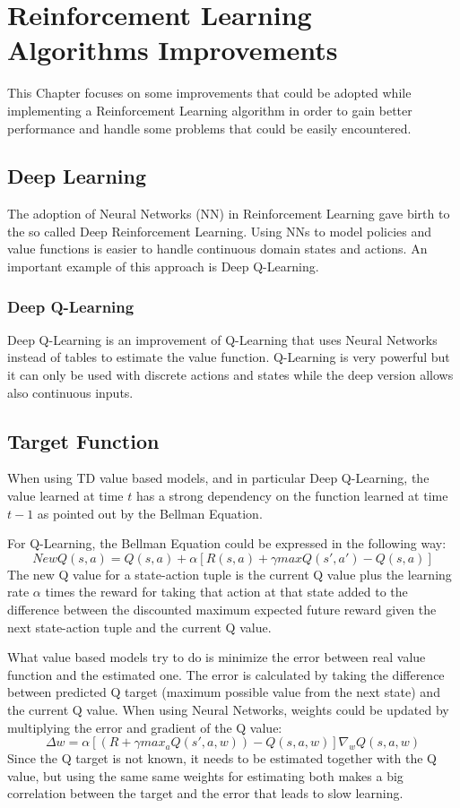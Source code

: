 \documentclass[Lau,oneside,noexaminfo]{sapthesis} %
\begin{document}
\chapter{Reinforcement Learning Algorithms Improvements}
This Chapter focuses on some improvements that could be adopted while implementing a Reinforcement Learning algorithm in order to gain better performance and handle some problems that could be easily encountered.
\section{Deep Learning}
The adoption of Neural Networks (NN) in Reinforcement Learning gave birth to the so called Deep Reinforcement Learning. Using NNs to model policies and value functions is easier to handle continuous domain states and actions. An important example of this approach is Deep Q-Learning.
\subsection{Deep Q-Learning}
Deep Q-Learning is an improvement of Q-Learning that uses Neural Networks instead of tables to estimate the value function. Q-Learning is very powerful but it can only be used with discrete actions and states while the deep version allows also continuous inputs.
\section{Target Function}
When using TD value based models, and in particular Deep Q-Learning, the value learned at time $t$ has a strong dependency on the function learned at time $t-1$ as pointed out by the Bellman Equation. 

For Q-Learning, the Bellman Equation could be expressed in the following way:
\begin{equation}
NewQ( s,a ) = Q( s,a ) + \alpha [ R(s,a) + \gamma maxQ(s',a') - Q(s,a) ]
\end{equation}
The new Q value for a state-action tuple is the current Q value plus the learning rate $\alpha$ times the reward for taking that action at that state added to the difference between the discounted  maximum expected future reward given the next state-action tuple and the current Q value. 

What value based models try to do is minimize the error between real value function and the estimated one. The error is calculated by taking the difference between predicted Q target (maximum possible value from the next state) and the current Q value. When using Neural Networks, weights could be updated by multiplying the error and gradient of the Q value:
\begin{equation}
\Delta w = \alpha [ (R + \gamma max_a Q(s',a,w)) - Q(s,a,w)] \nabla_w Q( s,a,w )
\end{equation}
Since the Q target is not known, it needs to be estimated together with the Q value, but using the same same weights for estimating both makes a big correlation between the target and the error that leads to slow learning. 
\end{document}
